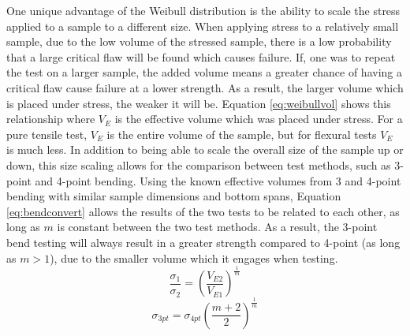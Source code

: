     One unique advantage of the Weibull distribution is the ability to scale the stress applied to a sample to a different size.
    When applying stress to a relatively small sample, due to the low volume of the stressed sample, there is a low probability that a large critical flaw will be found which causes failure.
    If, one was to repeat the test on a larger sample, the added volume means a greater chance of having a critical flaw cause failure at a lower strength.
    As a result, the larger volume which is placed under stress, the weaker it will be.
    Equation \ref{eq:weibullvol} shows this relationship where $V_{E}$ is the effective volume which was placed under stress.
    For a pure tensile test, $V_E$ is the entire volume of the sample, but for flexural tests $V_E$ is much less.
    In addition to being able to scale the overall size of the sample up or down, this size scaling allows for the comparison between test methods, such as 3-point and 4-point bending.
    Using the known effective volumes from 3 and 4-point bending with similar sample dimensions and bottom spans, Equation \ref{eq:bendconvert} allows the results of the two tests to be related to each other, as long as $m$ is constant between the two test methods.
    As a result, the 3-point bend testing will always result in a greater strength compared to 4-point (as long as $m > 1$), due to the smaller volume which it engages when testing.
    \begin{equation}
        \label{eq:weibullvol}
        \frac{\sigma_1}{\sigma_2} = \left(\frac{V_{E2}}{V_{E1}}\right)^\frac{1}{m}
    \end{equation}
    \begin{equation}
        \label{eq:bendconvert}
        \sigma_{3pt} = \sigma_{4pt}\left(\frac{m+2}{2}\right)^\frac{1}{m}
    \end{equation}
